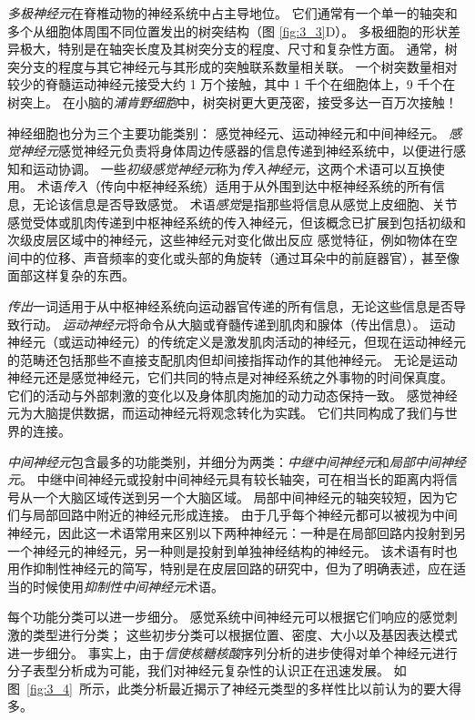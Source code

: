 \textit{多极神经元}在脊椎动物的神经系统中占主导地位。 
它们通常有一个单一的轴突和多个从细胞体周围不同位置发出的树突结构（图 \ref{fig:3_3}D）。 
多极细胞的形状差异极大，特别是在轴突长度及其树突分支的程度、尺寸和复杂性方面。 
通常，树突分支的程度与其它神经元与其形成的突触联系数量相关联。 
一个树突数量相对较少的脊髓运动神经元接受大约 1 万个接触，其中 1 千个在细胞体上，9 千个在树突上。
在小脑的\textit{浦肯野细胞}中，树突树更大更茂密，接受多达一百万次接触！


神经细胞也分为三个主要功能类别：
感觉神经元、运动神经元和中间神经元。 
\textit{感觉神经元}感觉神经元负责将身体周边传感器的信息传递到神经系统中，以便进行感知和运动协调。
一些\textit{初级感觉神经元}称为\textit{传入神经元}，这两个术语可以互换使用。 
术语\textit{传入}（传向中枢神经系统）适用于从外围到达中枢神经系统的所有信息，无论该信息是否导致感觉。
术语\textit{感觉}是指那些将信息从感觉上皮细胞、关节感觉受体或肌肉传递到中枢神经系统的传入神经元，但该概念已扩展到包括初级和次级皮层区域中的神经元，这些神经元对变化做出反应 感觉特征，例如物体在空间中的位移、声音频率的变化或头部的角旋转（通过耳朵中的前庭器官），甚至像面部这样复杂的东西。


\textit{传出}一词适用于从中枢神经系统向运动器官传递的所有信息，无论这些信息是否导致行动。
\textit{运动神经元}将命令从大脑或脊髓传递到肌肉和腺体（传出信息）。 
运动神经元（或运动神经元）的传统定义是激发肌肉活动的神经元，但现在运动神经元的范畴还包括那些不直接支配肌肉但却间接指挥动作的其他神经元。
无论是运动神经元还是感觉神经元，它们共同的特点是对神经系统之外事物的时间保真度。
它们的活动与外部刺激的变化以及身体肌肉施加的动力动态保持一致。	
感觉神经元为大脑提供数据，而运动神经元将观念转化为实践。 
它们共同构成了我们与世界的连接。


\textit{中间神经元}包含最多的功能类别，并细分为两类：\textit{中继中间神经元}和\textit{局部中间神经元}。
中继中间神经元或投射中间神经元具有较长轴突，可在相当长的距离内将信号从一个大脑区域传送到另一个大脑区域。
局部中间神经元的轴突较短，因为它们与局部回路中附近的神经元形成连接。
由于几乎每个神经元都可以被视为中间神经元，因此这一术语常用来区别以下两种神经元：一种是在局部回路内投射到另一个神经元的神经元，另一种则是投射到单独神经结构的神经元。
该术语有时也用作抑制性神经元的简写，特别是在皮层回路的研究中，但为了明确表述，应在适当的时候使用\textit{抑制性中间神经元}术语。


每个功能分类可以进一步细分。 
感觉系统中间神经元可以根据它们响应的感觉刺激的类型进行分类； 
这些初步分类可以根据位置、密度、大小以及基因表达模式进一步细分。
事实上，由于\textit{信使核糖核酸}序列分析的进步使得对单个神经元进行分子表型分析成为可能，我们对神经元复杂性的认识正在迅速发展。 
如图~\ref{fig:3_4}~所示，此类分析最近揭示了神经元类型的多样性比以前认为的要大得多。


